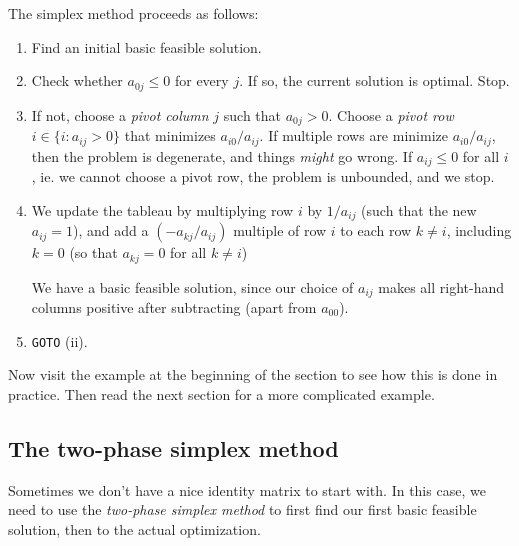\documentclass[a4paper]{article}
\begin{document}
The simplex method proceeds as follows:
\begin{enumerate}
  \item Find an initial basic feasible solution.
  \item Check whether $a_{0j} \leq 0$ for every $j$. If so, the current solution is optimal. Stop.
  \item If not, choose a \emph{pivot column} $j$ such that $a_{0j} > 0$. Choose a \emph{pivot row} $i\in \{i: a_{ij} > 0\}$ that minimizes $a_{i0}/a_{ij}$. If multiple rows are minimize $a_{i0}/a_{ij}$, then the problem is degenerate, and things \emph{might} go wrong. If $a_{ij} \leq 0$ for all $i$, ie. we cannot choose a pivot row, the problem is unbounded, and we stop.
  \item We update the tableau by multiplying row $i$ by $1/a_{ij}$ (such that the new $a_{ij} = 1$), and add a $(-a_{kj}/a_{ij})$ multiple of row $i$ to each row $k \not= i$, including $k = 0$ (so that $a_{kj} = 0$ for all $k \not= i$)

    We have a basic feasible solution, since our choice of $a_{ij}$ makes all right-hand columns positive after subtracting (apart from $a_{00}$).
  \item \texttt{GOTO} (ii).
\end{enumerate}

Now visit the example at the beginning of the section to see how this is done in practice. Then read the next section for a more complicated example.
\subsection{The two-phase simplex method}
Sometimes we don't have a nice identity matrix to start with. In this case, we need to use the \emph{two-phase simplex method} to first find our first basic feasible solution, then to the actual optimization.
\end{document}

